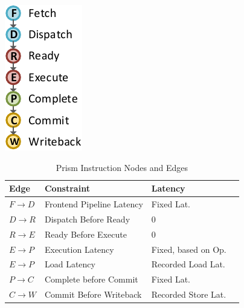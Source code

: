 \begin{table}[tbp]
  \begin{center}
  \begin{minipage}{0.25\linewidth}

  \begin{center}
    \includegraphics[width=0.4\linewidth]{figs/inst-nodes.pdf}
  \end{center}

  \end{minipage}\quad
  \begin{minipage}{0.6\linewidth}
    \scriptsize
    \setlength{\tabcolsep}{.19em}
    \def\arraystretch{1.1} 

    \begin{tabular}{llll}\toprule
       \textbf{Edge} & \textbf{Constraint} & \textbf{Latency}\\ \midrule
\rowcolor{CNew}
         $F \rightarrow D$         & Frontend Pipeline Latency & Fixed Lat. \\
         $D \rightarrow R$         & Dispatch Before Ready & 0 \\
         $R \rightarrow E$         & Ready Before Execute & 0 \\ 
         $E \rightarrow P$         & Execution Latency & Fixed, based on Op. \\
         $E \rightarrow P$         & Load Latency & Recorded Load Lat. \\
         $P \rightarrow C$         & Complete before Commit & Fixed Lat. \\
\rowcolor{CNew}
         $C \rightarrow W$         & Commit Before Writeback & Recorded Store Lat. \\ 
      \bottomrule
    \end{tabular}


  \end{minipage}
\end{center}
\vspace{-0.2in}
\caption{Prism Instruction Nodes and Edges}
\label{tab:inst-nodes}
\vspace{-0.1in}
\end{table}

